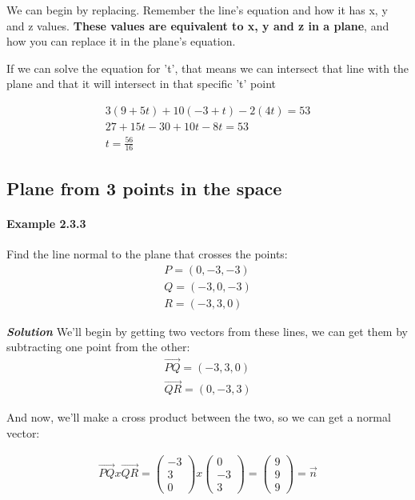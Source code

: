 \documentclass[11pt,fleqn]{book} %
\begin{document}
We can begin by replacing. Remember the line's equation and how it has x, y and z values.
\textbf{These values are equivalent to x, y and z in a plane}, and how you can replace it
in the plane's equation.

If we can solve the equation for
't', that means we can intersect that line with the 
plane and that it will intersect in that specific 't' point

\begin{gather}
    3(9 + 5t) + 10 (-3 + t) -2(4t) =53\\
    27 + 15t -30 + 10t -8t = 53\\
    t = \frac{56}{16} 
\end{gather}

\subsection*{Plane from 3 points in the space}

\paragraph{Example 2.3.3}

Find the line normal to the plane that crosses the points:
\begin{gather}
    P = (0,-3,-3)\\
    Q = (-3,0,-3)\\
    R = (-3,3,0)
\end{gather}

\textit{\textbf{Solution}}
We'll begin by getting two vectors from these lines, we can get them by subtracting one point from the other:
\begin{gather}
    \vec{PQ} = (-3,3,0)\\
    \vec{QR} = (0,-3,3)
\end{gather}

And now, we'll make a cross product between the two, so we can get a normal vector:

\begin{gather}
    \vec{PQ} x \vec{QR} = \begin{pmatrix}
        -3\\3\\0
    \end{pmatrix} x \begin{pmatrix}
        0\\-3\\3
    \end{pmatrix} = \begin{pmatrix}
        9\\9\\9
    \end{pmatrix} = \vec{n}
\end{gather}
\end{document}
